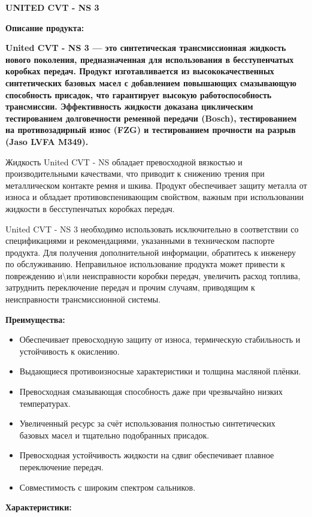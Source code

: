 \documentclass[12pt,a4paper]{article}
\begin{document}
\begin{spacing}{2.5}
{\textbf{\fontsize{20pt}{30pt}\selectfont UNITED CVT - NS 3}}
\end{spacing}

\begin{spacing}{2.5}
{\textbf{\fontsize{14pt}{4pt}\selectfont Описание продукта:}}
\end{spacing}

{\textbf{United CVT - NS 3 — это синтетическая трансмиссионная жидкость нового поколения, предназначенная для использования в бесступенчатых коробках передач. Продукт изготавливается из высококачественных синтетических базовых масел с добавлением повышающих смазывающую способность присадок, что гарантирует высокую работоспособность трансмиссии.  Эффективность жидкости доказана циклическим тестированием долговечности ременной передачи (Bosch), тестированием на противозадирный износ (FZG) и тестированием прочности на разрыв (Jaso LVFA M349).}}

Жидкость United CVT - NS обладает превосходной вязкостью и производительными качествами, что приводит к снижению трения при металлическом контакте ремня и шкива. Продукт обеспечивает защиту металла от износа и обладает противовспенивающим свойством, важным при использовании жидкости в бесступенчатых коробках передач.

United CVT - NS 3 необходимо использовать исключительно в соответствии со спецификациями и рекомендациями, указанными в техническом паспорте продукта.
Для получения дополнительной информации, обратитесь к инженеру по обслуживанию. Неправильное использование продукта может привести к повреждению и\textbackslash или неисправности коробки передач, увеличить расход топлива, затруднить переключение передач и прочим случаям, приводящим к неисправности трансмиссионной системы.
{\begin{spacing}{2.5}
\end{spacing}}

{\textbf{\fontsize{14pt}{10pt}\selectfont Преимущества:}}

\begin{itemize}[itemsep=1.4pt]

\item  Обеспечивает превосходную защиту от износа, термическую стабильность и устойчивость к окислению.
\item   Выдающиеся противоизносные характеристики и толщина масляной плёнки.
\item  Превосходная смазывающая способность даже при чрезвычайно низких температурах.
\item  Увеличенный ресурс за счёт использования полностью синтетических базовых масел и тщательно подобранных присадок.
\item  Превосходная устойчивость жидкости на сдвиг обеспечивает плавное переключение передач.
\item  Совместимость с широким спектром сальников.
\end{itemize}
{\begin{spacing}{10}
\end{spacing}}
\begin{spacing}{1}
{\textbf{\fontsize{14pt}{4pt}\selectfont Характеристики:}}
\end{spacing}
\end{document}
